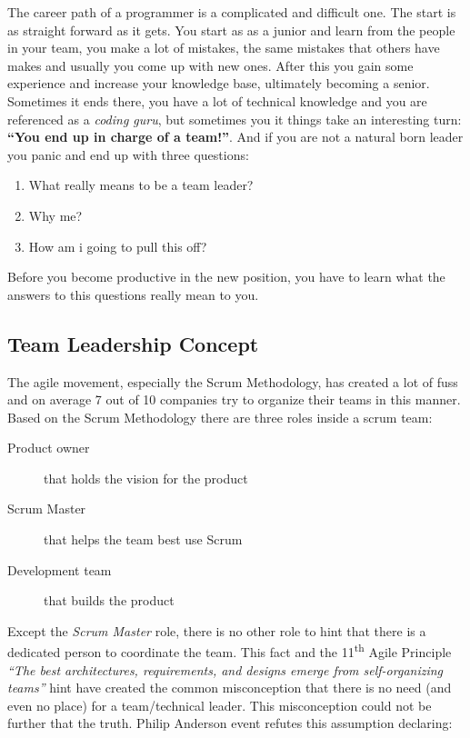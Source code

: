 
The career path of a programmer is a complicated and difficult one. The start is as straight forward as it gets. You start as as a junior and learn from the people in your team, you make a lot of mistakes, the same mistakes that others have makes and usually you come up with new ones. After this you gain some experience and increase your knowledge base, ultimately becoming a senior. Sometimes it ends there, you have a lot of technical knowledge and you are referenced as a \textit{coding guru}, but sometimes you it things take an interesting turn: \textbf{``You end up in charge of a team!''}. And if you are not a natural born leader you panic and end up with three questions:

\begin{enumerate}
	\item What really means to be a team leader?
	\item Why me?
	\item How am i going to pull this off?
\end{enumerate}

Before you become productive in the new position, you have to learn what the answers to this questions really mean to you.

\subsection{Team Leadership Concept}
\label{sub-sec:teamleadershipconcept}

The agile movement, especially the Scrum Methodology, has created a lot of fuss and on average 7 out of 10 companies try to organize their teams in this manner. Based on the Scrum Methodology there are three roles \cite{scrum} inside a scrum team:

\begin{description}
	\item[Product owner] that holds the vision for the product
	\item[Scrum Master] that helps the team best use Scrum
	\item[Development team] that builds the product
\end{description}

Except the \textit{{Scrum Master}} role, there is no other role to hint that there is a dedicated person to coordinate the team. This fact and the 11\textsuperscript{th} Agile Principle \textit{``The best architectures, requirements, and designs emerge from self-organizing teams''}\cite{agile-manifesto} hint have created the common misconception that there is no need (and even no place) for a team/technical leader. This misconception could not be further that the truth. Philip Anderson event refutes this assumption declaring:

